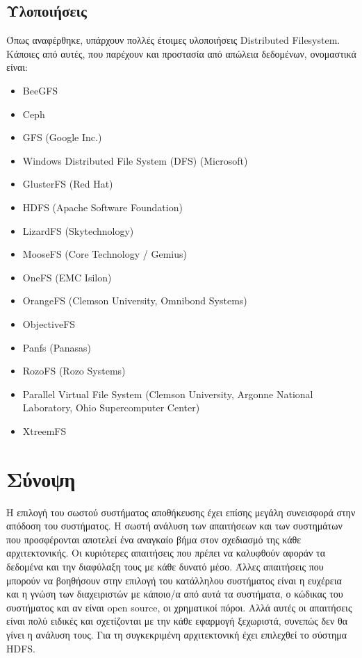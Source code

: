 \subsection{Υλοποιήσεις}
Όπως αναφέρθηκε, υπάρχουν πολλές έτοιμες υλοποιήσεις Distributed Filesystem.
Κάποιες από αυτές, που παρέχουν και προστασία από απώλεια δεδομένων, ονομαστικά είναι:
\begin{itemize}
\item BeeGFS
\item Ceph
\item GFS (Google Inc.)
\item Windows Distributed File System (DFS) (Microsoft)
\item GlusterFS (Red Hat)
\item HDFS (Apache Software Foundation)
\item LizardFS (Skytechnology)
\item MooseFS (Core Technology / Gemius)
\item OneFS (EMC Isilon)
\item OrangeFS (Clemson University, Omnibond Systems)
\item ObjectiveFS
\item Panfs (Panasas)
\item RozoFS (Rozo Systems)
\item Parallel Virtual File System (Clemson University, Argonne National Laboratory, Ohio Supercomputer Center)
\item XtreemFS
\end{itemize}

\section{Σύνοψη}
Η επιλογή του σωστού συστήματος αποθήκευσης έχει επίσης μεγάλη συνεισφορά στην απόδοση του συστήματος. Η σωστή ανάλυση των απαιτήσεων και των συστημάτων που προσφέρονται αποτελεί ένα αναγκαίο βήμα στον σχεδιασμό της κάθε αρχιτεκτονικής. Οι κυριότερες απαιτήσεις που πρέπει να καλυφθούν αφοράν τα δεδομένα και την διαφύλαξη τους με κάθε δυνατό μέσο.
Άλλες απαιτήσεις που μπορούν να βοηθήσουν στην επιλογή του κατάλληλου συστήματος είναι η ευχέρεια και η γνώση των διαχειριστών με κάποιο/α από αυτά τα συστήματα, ο κώδικας του συστήματος και αν είναι open source, οι χρηματικοί πόροι. Αλλά αυτές οι απαιτήσεις είναι πολύ ειδικές και σχετίζονται με την κάθε εφαρμογή ξεχωριστά, συνεπώς δεν θα γίνει η ανάλυση τους.
\newline
Για τη συγκεκριμένη αρχιτεκτονική έχει επιλεχθεί το σύστημα HDFS.